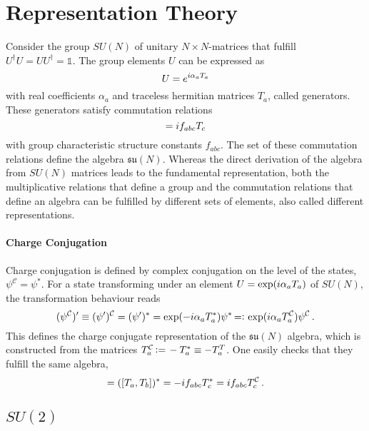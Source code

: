 \section{Representation Theory}
\label{sec:Apdx_RepTheory}

Consider the group $SU(N)$ of unitary ${N\times N}$-matrices that fulfill ${U^\dagger U=UU^\dagger=\mathbb{1}}$. The group elements $U$ can be expressed as
\begin{equation}
    U=e^{{i} \alpha_aT_a}
\end{equation}
with real coefficients $\alpha_a$ and traceless hermitian matrices $T_a$, called generators. These generators satisfy commutation relations
\begin{equation}
    [T_a,T_b]=\imagu f_{abc}T_c
\end{equation}
with group characteristic structure constants $f_{abc}$. The set of these commutation relations define the algebra $\mathfrak{su}(N)$. Whereas the direct derivation of the algebra from $SU(N)$ matrices leads to the fundamental representation, both the multiplicative relations that define a group and the commutation relations that define an algebra can be fulfilled by different sets of elements, also called different representations. 

\paragraph{Charge Conjugation}

Charge conjugation is defined by complex conjugation on the level of the states, ${\psi^\mathcal{C}=\psi^*}$.  For a state transforming under an element ${U=\exp({i}\alpha_a T_a)}$ of $SU(N)$, the transformation behaviour reads
\begin{equation}
    (\psi^\mathcal{C})^\prime\equiv(\psi^\prime)^\mathcal{C}=(\psi^\prime)^*=\exp(-{i}\alpha_aT_a^*)\psi^*{\,=\vcentcolon\,}\exp({i}\alpha_aT_a^\mathcal{C})\psi^\mathcal{C}\,.
\end{equation}
This defines the charge conjugate representation of the $\mathfrak{su}(N)$ algebra, which is constructed from the matrices ${T_a^\mathcal{C}{\,\vcentcolon=\,} -T_a^*\equiv -T_a^T}$. One easily checks that they fulfill the same algebra,
\begin{equation}
    [T_a^\mathcal{C},T_b^\mathcal{C}]=([T_a,T_b])^*=-\imagu f_{abc}T_c^*=\imagu f_{abc}T_c^\mathcal{C}\,.
\end{equation}

\subsection{$SU(2)$}

